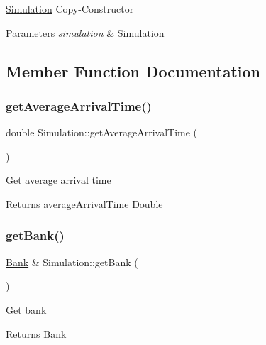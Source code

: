 \hyperlink{classSimulation}{Simulation} Copy-\/\+Constructor 
\begin{DoxyParams}{Parameters}
{\em simulation} & \hyperlink{classSimulation}{Simulation} \\
\hline
\end{DoxyParams}


\subsection{Member Function Documentation}
\mbox{\label{classSimulation_a1e4f97c6011a0cbce91c5034c917ab46}} 
\subsubsection{\texorpdfstring{get\+Average\+Arrival\+Time()}{getAverageArrivalTime()}}
{\footnotesize\ttfamily double Simulation\+::get\+Average\+Arrival\+Time (\begin{DoxyParamCaption}{ }\end{DoxyParamCaption})}

Get average arrival time \begin{DoxyReturn}{Returns}
average\+Arrival\+Time Double 
\end{DoxyReturn}
\mbox{\label{classSimulation_a280ef124f9f6395a446b36a9dd45e4bc}} 
\subsubsection{\texorpdfstring{get\+Bank()}{getBank()}}
{\footnotesize\ttfamily \hyperlink{classBank}{Bank} \& Simulation\+::get\+Bank (\begin{DoxyParamCaption}{ }\end{DoxyParamCaption})}

Get bank \begin{DoxyReturn}{Returns}
\hyperlink{classBank}{Bank} 
\end{DoxyReturn}
\mbox{\label{classSimulation_a242c58ccefca3705bdc47ee7827c24fe}} 
